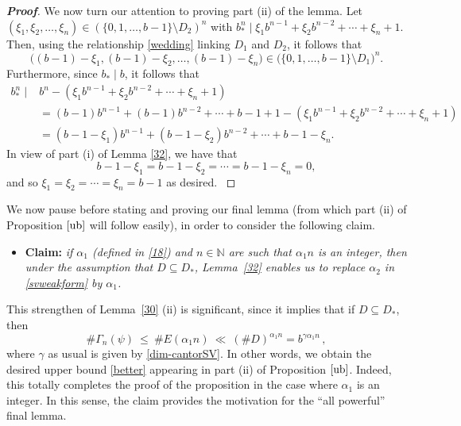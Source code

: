 \documentclass[12pt]{article}
\theoremstyle{definition}
\theoremstyle{remark}
\begin{document}
\begin{proof}[\rm \textbf{Proof}]
 We now turn our attention to proving part (ii) of the lemma.  
Let $(\xi_{1},\xi_{2},\ldots,\xi_{n})\in(\{0,1,\ldots,b-1\}\setminus D_{2})^{n}$ with
$b_{*}^{n}\mid\xi_{1}b^{n-1}+\xi_{2}b^{n-2} +\cdots+\xi_{n} +1$. 
Then, using the relationship \eqref{wedding} linking $D_{1} $ and $D_{2} $, it follows that
$$\big( (b-1)-\xi_{1},(b-1)-\xi_{2},\ldots,(b-1)-\xi_{n}  \big )\in\big(\{0,1,\ldots,b-1\}\setminus D_{1}\big)^{n}.$$
Furthermore, since  $b_{*}\mid b$, it follows that
\begin{equation*}
\begin{aligned}
b_{*}^{n}\mid & b^{n}-(\xi_{1}b^{n-1}+\xi_{2}b^{n-2} +\cdots+\xi_{n}+1) \\[2ex]
&=(b-1)b^{n-1}+(b-1)b^{n-2} +\cdots+b-1+1-(\xi_{1}b^{n-1}+\xi_{2}b^{n-2} +\cdots+\xi_{n}+1)\\[2ex]
&=(b-1-\xi_{1})b^{n-1}+(b-1-\xi_{2})b^{n-2}+\cdots+b-1-\xi_{n}.
\end{aligned}
\end{equation*}
In view of part (i) of Lemma \ref{32}, we have  that 
$$b-1-\xi_{1}=b-1-\xi_{2}=\cdots=b-1-\xi_{n}=0,$$
and so 
$\xi_{1}=\xi_{2}=\cdots=\xi_{n}=b-1$ as desired.
\textrm{}
\end{proof}




We now pause before stating and proving our  final lemma  (from which  part (ii) of Proposition $\ref{ub}$ will follow easily), in order  to consider the following claim.
\begin{itemize}
    \item[]\textbf{Claim:}   {\em if $\alpha_1$ {\rm(}defined in \eqref{18}{\rm)} and $n \in \mathbb{N}$  are  such that  $\alpha_1n $ is an integer,  then  under the assumption that  $ D\subseteq D_{*}$,   Lemma~\ref{32}  enables us to  replace  $\alpha_2 $ in \eqref{svweakform}  by $\alpha_1$.}
\end{itemize}
 This strengthen of Lemma~\ref{30} (ii)  is significant, since it implies that if $ D\subseteq D_{*}$,   then   
$$\#\Gamma_{n}(\psi)   \ \le \  \#E(\alpha_1n)   \ \ll \    (\#D)^{\alpha_{1}n}=b^{\gamma\alpha_{1}n}   \, ,    %
$$
where $ \gamma $ as usual is given by   \eqref{dim-cantorSV}.  
In other words,  we obtain  the desired upper bound  \eqref{better}  appearing in part (ii) of Proposition $\ref{ub}$. Indeed, this totally  completes the proof of the proposition in the case where  $\alpha_1 $ is an integer.  In this sense,  the claim provides the motivation for  the ``all powerful''  final lemma.  
\end{document}
